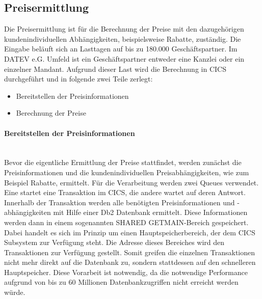 \subsection{Preisermittlung}\label{ssec:preis}
Die Preisermittlung ist für die Berechnung der Preise mit den dazugehörigen kundenindividuellen Abhängigkeiten, beispielsweise Rabatte, zuständig.
Die Eingabe beläuft sich an Lasttagen auf bis zu 180.000 Geschäftspartner.
Im DATEV e.G. Umfeld ist ein Geschäftspartner entweder eine Kanzlei oder ein einzelner Mandant.
Aufgrund dieser Last wird die Berechnung in CICS durchgeführt und in folgende zwei Teile zerlegt:
\begin{itemize}
\item Bereitstellen der Preisinformationen
\item Berechnung der Preise
\end{itemize}
\paragraph{Bereitstellen der Preisinformationen}~\\
Bevor die eigentliche Ermittlung der Preise stattfindet, werden zunächst die Preisinformationen und die kundenindividuellen Preisabhängigkeiten, wie zum Beispiel Rabatte, ermittelt.
Für die Verarbeitung werden zwei Queues verwendet.
Eine startet eine Transaktion im CICS, die andere wartet auf deren Antwort.
Innerhalb der Transaktion werden alle benötigten Preisinformationen und -abhängigkeiten mit Hilfe einer Db2 Datenbank ermittelt.
Diese Informationen werden dann in einem sogenannten \glqq SHARED GETMAIN\grqq-Bereich gespeichert.
Dabei handelt es sich im Prinzip um einen Hauptspeicherbereich, der dem CICS Subsystem zur Verfügung steht.
Die Adresse dieses Bereiches wird den Transaktionen zur Verfügung gestellt.
Somit greifen die einzelnen Transaktionen nicht mehr direkt auf die Datenbank zu, sondern stattdessen auf den schnelleren Hauptspeicher.
Diese Vorarbeit ist notwendig, da die notwendige Performance aufgrund von bis zu 60 Millionen Datenbankzugriffen nicht erreicht werden würde.

